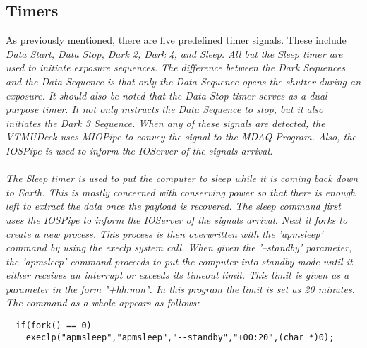 \subsection{Timers}
As previously mentioned, there are five predefined timer signals. These include \it Data 
Start, Data Stop, Dark 2, Dark 4, \rm and \it Sleep\rm . All but the \it Sleep \rm timer 
are used to initiate exposure sequences. The difference between the Dark Sequences and the 
Data Sequence is that only the Data Sequence opens the shutter during an exposure. It 
should also be noted that the \it Data Stop \rm timer serves as a dual purpose timer. It not only 
instructs the Data Sequence to stop, but it also initiates the Dark 3 Sequence. When any 
of these signals are detected, the VTMUDeck uses MIOPipe to convey the signal to the MDAQ 
Program. Also, the IOSPipe is used to inform the IOServer of the signals arrival.
\\
\\
The \it Sleep \rm timer is used to put the computer to sleep while it is coming back down 
to Earth. This is mostly concerned with conserving power so that there is enough left to 
extract the data once the payload is recovered. The sleep command first uses the IOSPipe 
to inform the IOServer of the signals arrival. Next it forks to create a new process. This 
process is then overwritten with the 'apmsleep' command by using the execlp system call. 
When given the '--standby' parameter, the 'apmsleep' command proceeds to put the computer 
into standby mode until it either receives an interrupt or exceeds its timeout limit. This 
limit is given as a parameter in the form "+hh:mm". In this program the limit is set as 20 
minutes. The command as a whole appears as follows:
\begin{verbatim}
  if(fork() == 0)
    execlp("apmsleep","apmsleep","--standby","+00:20",(char *)0);
\end{verbatim}

